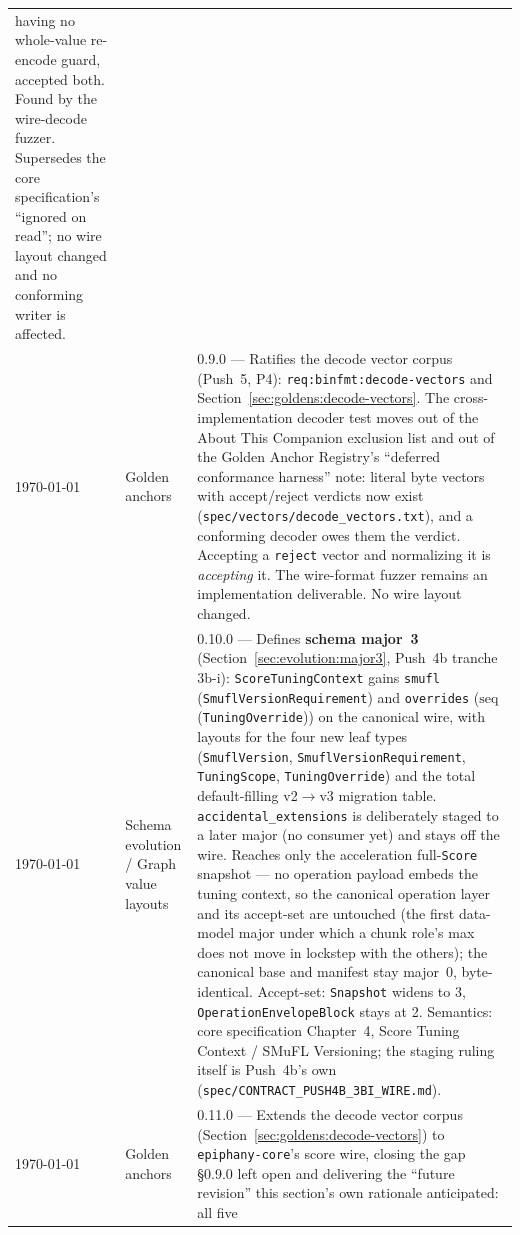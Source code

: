 \documentclass[11pt,letterpaper]{report}
\newcommand{\tablenums}[1]{{\addfontfeatures{Numbers={Lining,Tabular}}#1}}
\newcommand{\sectionsc}[1]{{\addfontfeatures{Letters=SmallCaps}#1}}
\begin{document}
\begin{longtable}{p{2cm} p{2.5cm} p{9cm}}
  having no whole-value re-encode guard, accepted both. Found by the wire-decode
  fuzzer. Supersedes the core specification's ``ignored on read''; no wire
  layout changed and no conforming writer is affected. \\
    \today & Golden anchors & 0.9.0 --- Ratifies the decode vector corpus
  (Push~5, P4): \texttt{req:binfmt:decode-vectors} and
  Section~\ref{sec:goldens:decode-vectors}. The cross-implementation decoder
  test moves out of the \sectionsc{About This Companion} exclusion list and out
  of the \sectionsc{Golden Anchor Registry}'s ``deferred conformance harness''
  note: literal byte vectors with accept/reject verdicts now exist
  (\texttt{spec/vectors/decode\_vectors.txt}), and a conforming decoder owes them
  the verdict. Accepting a \texttt{reject} vector and normalizing it is
  \emph{accepting} it. The wire-format fuzzer remains an implementation
  deliverable. No wire layout changed. \\
    \today & Schema evolution / Graph value layouts & 0.10.0 --- Defines
  \textbf{schema major~3} (Section~\ref{sec:evolution:major3}, Push~4b
  tranche 3b-i): \texttt{ScoreTuningContext} gains \texttt{smufl}
  (\texttt{SmuflVersionRequirement}) and \texttt{overrides}
  ($\mathrm{seq}$(\texttt{TuningOverride})) on the canonical wire, with
  layouts for the four new leaf types (\texttt{SmuflVersion},
  \texttt{SmuflVersionRequirement}, \texttt{TuningScope},
  \texttt{TuningOverride}) and the total default-filling v2${\to}$v3
  migration table. \texttt{accidental\_extensions} is deliberately staged to
  a later major (no consumer yet) and stays off the wire. Reaches only the
  acceleration full-\texttt{Score} snapshot --- no operation payload embeds
  the tuning context, so the canonical operation layer and its accept-set
  are untouched (the first data-model major under which a chunk role's max
  does not move in lockstep with the others); the canonical base and
  manifest stay major~0, byte-identical. Accept-set: \texttt{Snapshot}
  widens to \tablenums{3}, \texttt{OperationEnvelopeBlock} stays at
  \tablenums{2}. Semantics: core specification Chapter~4, \sectionsc{Score
  Tuning Context} / \sectionsc{SMuFL Versioning}; the staging ruling itself
  is Push~4b's own (\texttt{spec/CONTRACT\_PUSH4B\_3BI\_WIRE.md}). \\
    \today & Golden anchors & 0.11.0 --- Extends the decode vector corpus
  (Section~\ref{sec:goldens:decode-vectors}) to \texttt{epiphany-core}'s score
  wire, closing the gap \S0.9.0 left open and delivering the ``future
  revision'' this section's own rationale anticipated: all five

\end{longtable}
\end{document}
